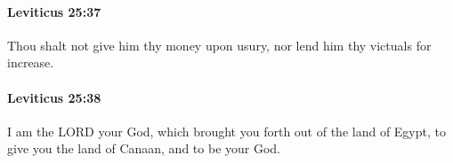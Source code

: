 		\paragraph{Leviticus 25:37} %
			\label{LEVITICUS-25-37}

			Thou shalt not give him thy money upon usury, nor lend him thy victuals for increase.


		\paragraph{Leviticus 25:38} %
			\label{LEVITICUS-25-38}

			I am the LORD your God, which brought you forth out of the land of Egypt, to give you the land of Canaan, and to be your God.


